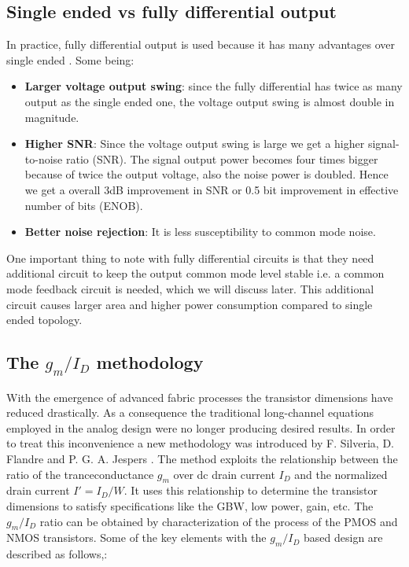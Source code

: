 \subsection{Single ended vs fully differential output }
In practice, fully differential output is used because it has many advantages over single ended \cite{Johns}. Some being:

\begin{itemize}

\item \textbf{Larger voltage output swing}: since the fully differential has twice as many output as the single ended one, the voltage output swing is almost double in magnitude. 

\item \textbf{Higher SNR}: Since the voltage output swing is large we get a higher signal-to-noise ratio (SNR). The signal output power becomes four times bigger because of twice the output voltage, also the noise power is doubled. Hence we get a overall 3dB improvement in SNR or 0.5 bit improvement in effective number of bits (ENOB).

\item \textbf{Better noise rejection}: It is less susceptibility to common mode noise.
\end{itemize}
One important thing to note with fully differential circuits is that they need additional circuit to keep the output common mode level stable i.e. a common mode feedback circuit is needed, which we will discuss later. This additional circuit causes larger area and higher power consumption compared to single ended topology\cite{Allen}. 

\subsection{The $g_m/I_D$ methodology}

With the emergence of advanced fabric processes the transistor dimensions have reduced drastically. As a consequence the traditional long-channel equations employed in the analog design were no longer producing desired results. In order to treat this inconvenience a new methodology was introduced by F. Silveria, D. Flandre and P. G. A. Jespers \cite{gm_id_1}. The method exploits the relationship between the ratio of the tranceconductance $g_m$ over dc drain current $I_D$ and the normalized drain current $I' = I_D/W$. It uses this relationship to determine the transistor dimensions to satisfy specifications like the GBW, low power, gain, etc. The $g_m/I_D$ ratio can be obtained by characterization of the process of the PMOS and NMOS transistors. Some of the key elements with the $g_m/I_D$  based design are described as follows\cite{gm_id_1},\cite{gm_id_2}:

